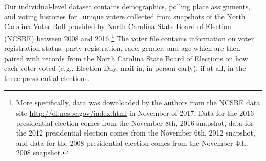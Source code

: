 \documentclass{cup_PSRM}
\begin{document}
Our individual-level dataset contains demographics, polling place assignments, and voting histories for  \unskip~unique voters collected from snapshots of the North Carolina Voter Roll provided by North Carolina State Board of Election (NCSBE) between 2008 and 2016.\footnote{More specifically, data was downloaded by the authors from the NCSBE data site \url{http://dl.ncsbe.gov/index.html} in November of 2017. Data for the 2016 presidential election comes from the November 8th, 2016 snapshot, data for the 2012 presidential election comes from the November 6th, 2012 snapshot, and data for the 2008 presidential election comes from the November 4th, 2008 snapshot.} The voter file contains information on voter registration status, party registration, race, gender, and age which are then paired with records from the North Carolina State Board of Elections on how each voter voted (e.g., Election Day, mail-in, in-person early), if at all, in the three presidential elections.
\end{document}
